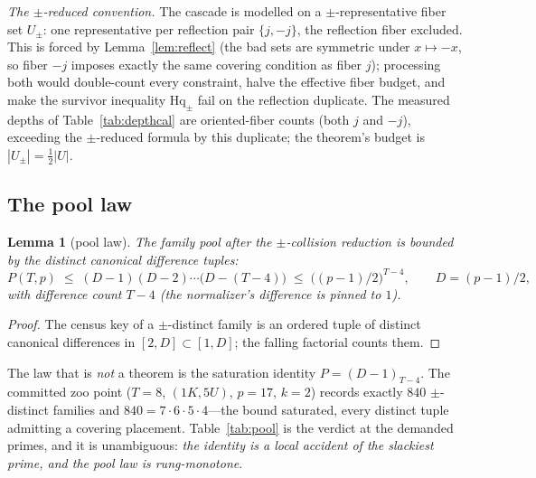 \documentclass[11pt,a4paper]{article}
\numberwithin{equation}{section}
\theoremstyle{plain}
\newtheorem{lemma}[theorem]{Lemma}
\theoremstyle{definition}
\theoremstyle{remark}
\begin{document}
\emph{The $\pm$-reduced convention.} The cascade is modelled on a
$\pm$-representative fiber set $U_\pm$: one representative per reflection
pair $\{j,-j\}$, the reflection fiber excluded. This is forced by
Lemma~\ref{lem:reflect} (the bad sets are symmetric under $x\mapsto-x$,
so fiber $-j$ imposes exactly the same covering condition as fiber $j$);
processing both would double-count every constraint, halve the effective
fiber budget, and make the survivor inequality $\mathrm{Hq}_\pm$ fail on
the reflection duplicate. The measured depths of
Table~\ref{tab:depthcal} are oriented-fiber counts (both $j$ and $-j$),
exceeding the $\pm$-reduced formula by this duplicate; the theorem's
budget is $|U_\pm|=\tfrac12|U|$.

\subsection{The pool law}\label{sec:scale-pool}

\begin{lemma}[pool law]\label{lem:pool}
The family pool after the $\pm$-collision reduction is bounded by the
distinct canonical difference tuples:
\[
P(T,p)\;\le\;(D-1)(D-2)\cdots\bigl(D-(T-4)\bigr)
\;\le\;\bigl((p-1)/2\bigr)^{T-4},
\qquad D=(p-1)/2,
\]
with difference count $T-4$ (the normalizer's difference is pinned to
$1$).
\end{lemma}

\begin{proof}
The census key of a $\pm$-distinct family is an ordered tuple of
distinct canonical differences in $[2,D]\subset[1,D]$; the falling
factorial counts them.
\end{proof}

The law that is \emph{not} a theorem is the saturation identity
$P=(D-1)_{T-4}$. The committed zoo point ($T=8$, $(1K,5U)$, $p=17$,
$k=2$) records exactly $840$ $\pm$-distinct families and
$840=7\cdot6\cdot5\cdot4$---the bound saturated, every distinct tuple
admitting a covering placement. Table~\ref{tab:pool} is the verdict at
the demanded primes, and it is unambiguous: \emph{the identity is a
local accident of the slackiest prime, and the pool law is
rung-monotone}.
\end{document}
